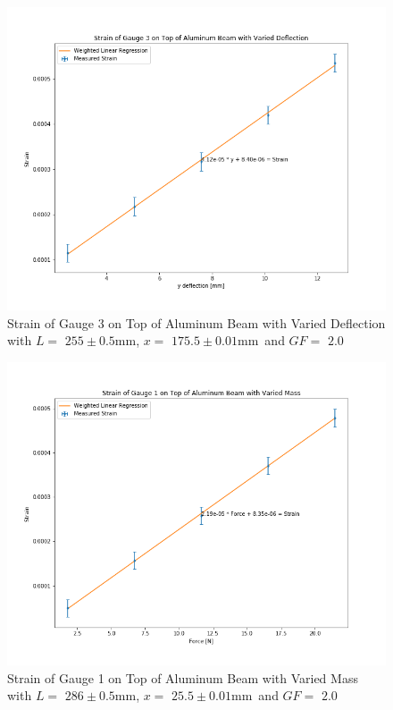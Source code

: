 \documentclass[]{article}
\newcommand{\xOne}{\ensuremath{25.5 \pm 0.01 \si{\milli\meter}}}
\newcommand{\xThree}{\ensuremath{175.5 \pm 0.01 \si{\milli\meter}}}
\newcommand{\GF}{\ensuremath{2.0}}
\newcommand{\LOne}{\ensuremath{255 \pm 0.5 \si{\milli\meter}}}
\newcommand{\LTwo}{\ensuremath{286 \pm 0.5 \si{\milli\meter}}}
\begin{document}
\newpage
\begin{figure}[hp]
    \includegraphics[width=\textwidth]{../output/graph/gauge3Strain.png}
    \caption{Strain of Gauge 3 on Top of Aluminum Beam with Varied Deflection
    with $L=$ \LOne, $x=$ \xThree\ and $GF=$ \GF}\label{fig:gauge3}
\end{figure}

\newpage
\begin{figure}[hp]
    \includegraphics[width=\textwidth]{../output/graph/weightStrain.png}
    \caption{Strain of Gauge 1 on Top of Aluminum Beam with Varied
    Mass with $L=$ \LTwo, $x=$ \xOne\ and $GF=$ \GF}\label{fig:weight}
\end{figure}
\end{document}
